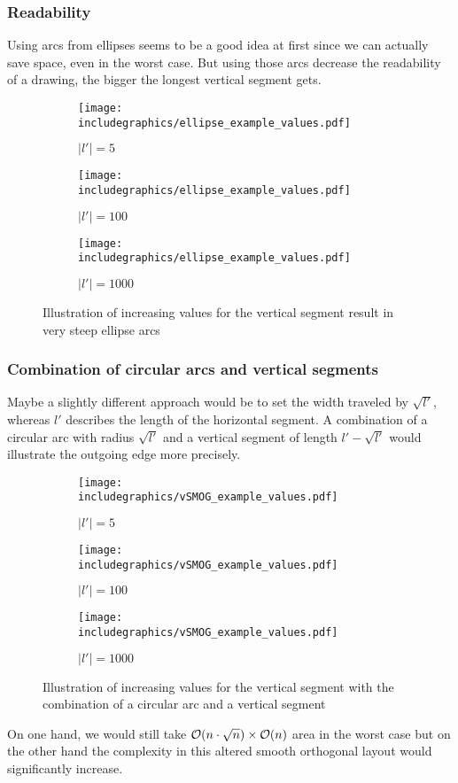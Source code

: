 \subsubsection*{Readability}
Using arcs from ellipses seems to be a good idea at first since we can actually save space, even in the worst case. But using those arcs decrease the readability of a drawing, the bigger the longest vertical segment gets.
\begin{figure}[H]
	\centering
	\begin{subfigure}{0.3\textwidth}
		\centering
		\texttt{[image: includegraphics/ellipse\_example\_values.pdf]}
		\caption{$|l'| = 5$}
	\end{subfigure}
	\begin{subfigure}{0.3\textwidth}
		\centering
		\texttt{[image: includegraphics/ellipse\_example\_values.pdf]}
		\caption{$|l'| = 100$}
	\end{subfigure}
	\begin{subfigure}{0.3\textwidth}
		\centering
		\texttt{[image: includegraphics/ellipse\_example\_values.pdf]}
		\caption{$|l'| = 1000$}
	\end{subfigure}
	\caption{Illustration of increasing values for the vertical segment result in very steep ellipse arcs}
\end{figure}
\subsubsection{Combination of circular arcs and vertical segments}
Maybe a slightly different approach would be to set the width traveled by $\sqrt{l'}$, whereas $l'$ describes the length of the horizontal segment. A combination of a circular arc with radius $\sqrt{l'}$ and a vertical segment of length $l'-\sqrt{l'}$ would illustrate the outgoing edge more precisely. 
\begin{figure}[H]
	\centering
	\begin{subfigure}{0.3\textwidth}
		\centering
		\texttt{[image: includegraphics/vSMOG\_example\_values.pdf]}
		\caption{$|l'| = 5$}
	\end{subfigure}
	\begin{subfigure}{0.3\textwidth}
		\centering
		\texttt{[image: includegraphics/vSMOG\_example\_values.pdf]}
		\caption{$|l'| = 100$}
	\end{subfigure}
	\begin{subfigure}{0.3\textwidth}
		\centering
		\texttt{[image: includegraphics/vSMOG\_example\_values.pdf]}
		\caption{$|l'| = 1000$}
	\end{subfigure}
	\caption{Illustration of increasing values for the vertical segment with the combination of a circular arc and a vertical segment}
\end{figure}
On one hand, we would still take $\mathcal{O}(n\cdot\sqrt{n})\times\mathcal{O}(n)$ area in the worst case but on the other hand the complexity in this altered smooth orthogonal layout would significantly increase.